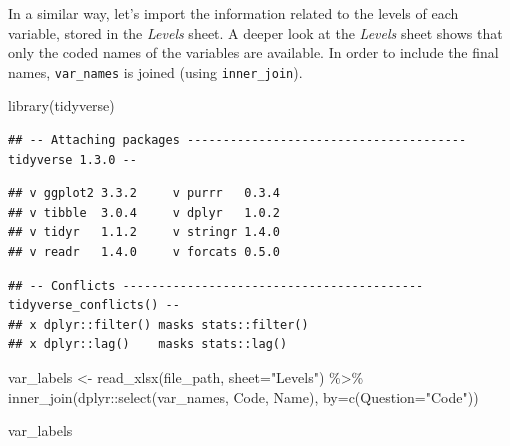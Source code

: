 \documentclass[
]{book}
\newenvironment{Shaded}{\begin{snugshade}}{\end{snugshade}}
\newcommand{\AttributeTok}[1]{\textcolor[rgb]{0.77,0.63,0.00}{#1}}
\newcommand{\FunctionTok}[1]{\textcolor[rgb]{0.00,0.00,0.00}{#1}}
\newcommand{\NormalTok}[1]{#1}
\newcommand{\OtherTok}[1]{\textcolor[rgb]{0.56,0.35,0.01}{#1}}
\newcommand{\SpecialCharTok}[1]{\textcolor[rgb]{0.00,0.00,0.00}{#1}}
\newcommand{\StringTok}[1]{\textcolor[rgb]{0.31,0.60,0.02}{#1}}
\begin{document}
In a similar way, let's import the information related to the levels of each variable, stored in the \emph{Levels} sheet.
A deeper look at the \emph{Levels} sheet shows that only the coded names of the variables are available. In order to include the final names, \texttt{var\_names} is joined (using \texttt{inner\_join}).

\begin{Shaded}
\begin{Highlighting}[]
\FunctionTok{library}\NormalTok{(tidyverse)}
\end{Highlighting}
\end{Shaded}

\begin{verbatim}
## -- Attaching packages --------------------------------------- tidyverse 1.3.0 --
\end{verbatim}

\begin{verbatim}
## v ggplot2 3.3.2     v purrr   0.3.4
## v tibble  3.0.4     v dplyr   1.0.2
## v tidyr   1.1.2     v stringr 1.4.0
## v readr   1.4.0     v forcats 0.5.0
\end{verbatim}

\begin{verbatim}
## -- Conflicts ------------------------------------------ tidyverse_conflicts() --
## x dplyr::filter() masks stats::filter()
## x dplyr::lag()    masks stats::lag()
\end{verbatim}

\begin{Shaded}
\begin{Highlighting}[]
\NormalTok{var\_labels }\OtherTok{\textless{}{-}} \FunctionTok{read\_xlsx}\NormalTok{(file\_path, }\AttributeTok{sheet=}\StringTok{"Levels"}\NormalTok{) }\SpecialCharTok{\%\textgreater{}\%} 
  \FunctionTok{inner\_join}\NormalTok{(dplyr}\SpecialCharTok{::}\FunctionTok{select}\NormalTok{(var\_names, Code, Name), }\AttributeTok{by=}\FunctionTok{c}\NormalTok{(}\AttributeTok{Question=}\StringTok{"Code"}\NormalTok{))}

\NormalTok{var\_labels}
\end{Highlighting}
\end{Shaded}
\end{document}
